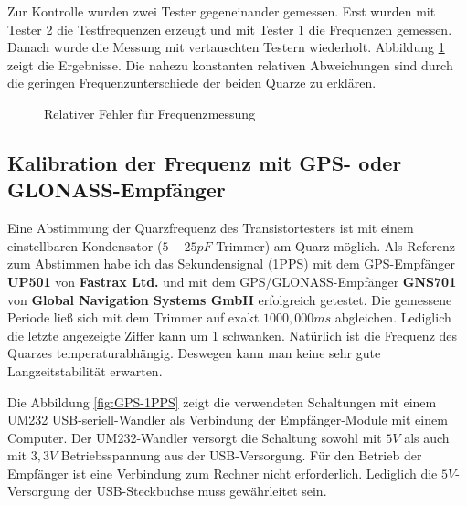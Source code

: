 Zur Kontrolle wurden zwei Tester gegeneinander gemessen.
Erst wurden mit Tester 2 die Testfrequenzen erzeugt und mit Tester 1 die Frequenzen gemessen.
Danach wurde die Messung mit vertauschten Testern wiederholt.
Abbildung \ref{fig:freq-ppm} zeigt die Ergebnisse.
Die nahezu konstanten relativen Abweichungen sind durch die geringen Frequenzunterschiede der beiden Quarze zu erklären.

\begin{figure}[H]
\centering

\caption{Relativer Fehler für Frequenzmessung }
\label{fig:freq-ppm}
\end{figure}

\subsection{Kalibration der Frequenz mit GPS- oder GLONASS-Empfänger}

Eine Abstimmung der Quarzfrequenz des Transistortesters ist mit einem einstellbaren Kondensator (\(5-25pF\) Trimmer) am Quarz möglich.
Als Referenz zum Abstimmen habe ich das Sekundensignal (1PPS) mit dem GPS-Empfänger {\bf UP501} von {\bf Fastrax Ltd.} und
mit dem GPS/GLONASS-Empfänger {\bf GNS701} von {\bf Global Navigation Systems GmbH} erfolgreich getestet.
Die gemessene Periode ließ sich mit dem Trimmer auf exakt \(1000,000ms\) abgleichen.
Lediglich die letzte angezeigte Ziffer kann um 1 schwanken.
Natürlich ist die Frequenz des Quarzes temperaturabhängig.
Deswegen kann man keine sehr gute Langzeitstabilität erwarten.

Die Abbildung \ref{fig:GPS-1PPS} zeigt die verwendeten Schaltungen mit einem
UM232 USB-seriell-Wandler als Verbindung der Empfänger-Module mit einem Computer.
Der UM232-Wandler versorgt die Schaltung sowohl mit \(5V\) als auch mit \(3,3V\) Betriebsspannung
aus der USB-Versorgung.
Für den Betrieb der Empfänger ist eine Verbindung zum Rechner nicht erforderlich.
Lediglich die \(5V\)-Versorgung der USB-Steckbuchse muss gewährleitet sein.

